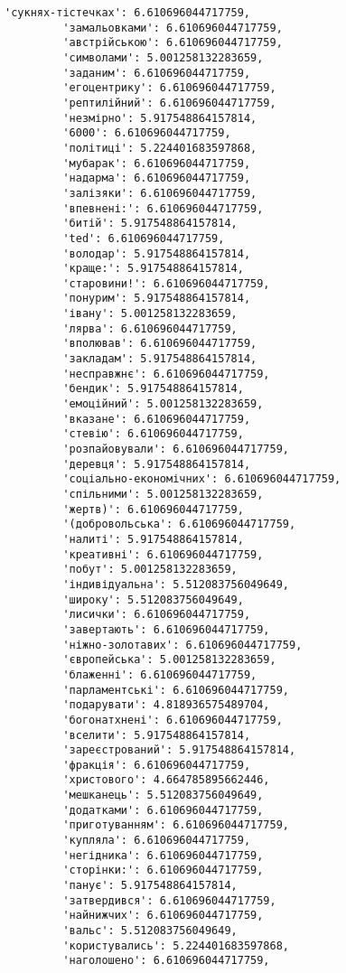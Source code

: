 \documentclass[11pt]{article}
\begin{document}
\begin{Verbatim}[commandchars=\\\{\}]
         'сукнях-тістечках': 6.610696044717759,
         'замальовками': 6.610696044717759,
         'австрійською': 6.610696044717759,
         'символами': 5.001258132283659,
         'заданим': 6.610696044717759,
         'егоцентрику': 6.610696044717759,
         'рептилійний': 6.610696044717759,
         'незмірно': 5.917548864157814,
         '6000': 6.610696044717759,
         'політиці': 5.224401683597868,
         'мубарак': 6.610696044717759,
         'надарма': 6.610696044717759,
         'залізяки': 6.610696044717759,
         'впевнені:': 6.610696044717759,
         'битій': 5.917548864157814,
         'ted': 6.610696044717759,
         'володар': 5.917548864157814,
         'краще:': 5.917548864157814,
         'старовини!': 6.610696044717759,
         'понурим': 5.917548864157814,
         'івану': 5.001258132283659,
         'лярва': 6.610696044717759,
         'вполював': 6.610696044717759,
         'закладам': 5.917548864157814,
         'несправжнє': 6.610696044717759,
         'бендик': 5.917548864157814,
         'емоційний': 5.001258132283659,
         'вказане': 6.610696044717759,
         'стевію': 6.610696044717759,
         'розпайовували': 6.610696044717759,
         'деревця': 5.917548864157814,
         'соціально-економічних': 6.610696044717759,
         'спільними': 5.001258132283659,
         'жертв)': 6.610696044717759,
         '(добровольська': 6.610696044717759,
         'налиті': 5.917548864157814,
         'креативні': 6.610696044717759,
         'побут': 5.001258132283659,
         'індивідуальна': 5.512083756049649,
         'широку': 5.512083756049649,
         'лисички': 6.610696044717759,
         'завертають': 6.610696044717759,
         'ніжно-золотавих': 6.610696044717759,
         'європейська': 5.001258132283659,
         'блаженні': 6.610696044717759,
         'парламентські': 6.610696044717759,
         'подарувати': 4.818936575489704,
         'богонатхнені': 6.610696044717759,
         'вселити': 5.917548864157814,
         'зареєстрований': 5.917548864157814,
         'фракція': 6.610696044717759,
         'христового': 4.664785895662446,
         'мешканець': 5.512083756049649,
         'додатками': 6.610696044717759,
         'приготуванням': 6.610696044717759,
         'купляла': 6.610696044717759,
         'негідника': 6.610696044717759,
         'сторінки:': 6.610696044717759,
         'панує': 5.917548864157814,
         'затвердився': 6.610696044717759,
         'найнижчих': 6.610696044717759,
         'вальс': 5.512083756049649,
         'користувались': 5.224401683597868,
         'наголошено': 6.610696044717759,

\end{Verbatim}
\end{document}
